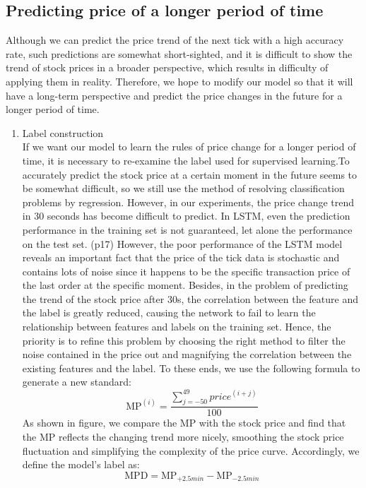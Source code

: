 \documentclass[10pt, conference, compsocconf]{IEEEtran}
\begin{document}
\subsection{Predicting price of a longer period of time}
Although we can predict the price trend of the next tick with a high accuracy rate, such predictions are somewhat short-sighted, and it is difficult to show the trend of stock prices in a broader perspective, which results in
difficulty of applying them in reality. Therefore, we hope to modify our model so that it will have a long-term perspective and predict the price changes in the future for a longer period of time.
\begin{enumerate}
	\item Label construction\\
	If we want our model to learn the rules of price change for a longer period of time, it is necessary to re-examine the label used for supervised learning.To accurately predict the stock price at a certain moment in the future
	seems to be somewhat difficult, so we still use the method of  resolving classification problems by regression. However, in our experiments, the price change trend in 30 seconds has become difficult to predict. In LSTM, even the
	prediction performance in the training set is not guaranteed, let alone the performance on the test set. (p17) However, the poor performance of the LSTM model reveals an important fact that the price of the tick data is stochastic 
	and contains lots of noise since it happens to be the specific transaction price of the last order at the specific moment. Besides, in the problem of predicting the trend of the stock price after 30s, the correlation between the 
	feature and the label is greatly reduced, causing the network to fail to learn the relationship between features and labels on the training set.
	Hence, the priority is to refine this problem by choosing the right method to filter the noise contained in the price out and magnifying the correlation between the existing features and the label. To these ends, we use the
	following formula to generate a new standard:
	$$
		\text{MP}^{(i)} = \frac{\sum_{j=-50}^{49}price^{(i+j)}}{100}
	$$
	As shown in figure, we compare the MP with the stock price and find that the MP reflects the changing trend more nicely, smoothing the stock price fluctuation and simplifying the complexity of the price curve. Accordingly, we define the model's label as:
	$$
		\text{MPD} = \text{MP}_{+2.5min} - \text{MP}_{-2.5min}
	$$
\end{enumerate}
\end{document}
